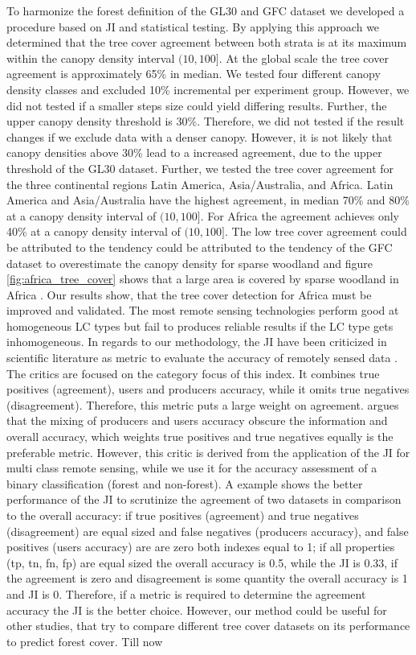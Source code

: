 		To harmonize the forest definition of the \ac{GL30} and \ac{GFC} dataset we developed a procedure based on \ac{JI} and statistical testing. By applying this approach we determined that the tree cover agreement between both strata is at its maximum within the canopy density interval $(10,100]$. At the global scale the tree cover agreement is approximately 65\% in median. We tested four different canopy density classes and excluded 10\% incremental per experiment group. However, we did not tested if a smaller steps size could yield differing results. Further, the upper canopy density threshold is 30\%. Therefore, we did not tested if the result changes if we exclude data with a denser canopy. However, it is not likely that canopy densities above 30\% lead to a increased agreement, due to the upper threshold of the \ac{GL30} dataset. Further, we tested the tree cover agreement for the three continental regions Latin America, Asia/Australia, and Africa. Latin America and Asia/Australia have the highest agreement, in median 70\% and 80\% at a canopy density interval of $(10,100]$. For Africa the agreement achieves only 40\% at a canopy density interval of $(10,100]$. The low tree cover agreement could be attributed to the tendency could be attributed to the tendency of the \ac{GFC} dataset to overestimate the canopy density for sparse woodland and figure \ref{fig:africa_tree_cover} shows that a large area is covered by sparse woodland in Africa \citep{Gross2017}. Our results show, that the tree cover detection for Africa must be improved and validated. The most remote sensing technologies perform good at homogeneous \ac{LC} types but fail to produces reliable results if the \ac{LC} type gets inhomogeneous. In regards to our methodology, the \ac{JI} have been criticized in scientific literature as metric to evaluate the accuracy of remotely sensed data \citep{Li2017a}. The critics are focused on the category focus of this index. It combines true positives (agreement), users and producers accuracy, while it omits true negatives (disagreement). Therefore, this metric puts a large weight on agreement. \citet{Li2017a} argues that the mixing of producers and users accuracy obscure the information and overall accuracy, which weights true positives and true negatives equally is the preferable metric. However, this critic is derived from the application of the \ac{JI} for multi class remote sensing, while we use it for the accuracy assessment of a binary classification (forest and non-forest). A example shows the better performance of the \ac{JI} to scrutinize the agreement of two datasets in comparison to the overall accuracy: if true positives (agreement) and true negatives (disagreement) are equal sized and false negatives (producers accuracy), and false positives (users accuracy) are are zero both indexes equal to 1; if all properties (tp, tn, fn, fp) are equal sized the overall accuracy is 0.5, while the \ac{JI} is 0.33, if the agreement is zero and disagreement is some quantity the overall accuracy is 1 and \ac{JI} is 0. Therefore, if a metric is required to determine the agreement accuracy the \ac{JI} is the better choice. However, our method could be useful for other studies, that try to compare different tree cover datasets on its performance to predict forest cover. Till now 